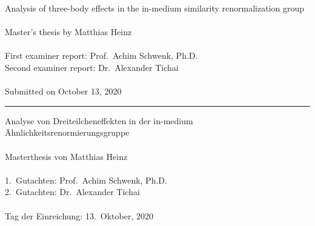 \noindent Analysis of three-body effects in the in-medium similarity renormalization group \\ \\
Master's thesis by Matthias Heinz \\ \\
First examiner report: Prof.~Achim Schwenk, Ph.D. \\
Second examiner report: Dr.~Alexander Tichai\\ \\
Submitted on October 13, 2020 \\
\hrule
\noindent Analyse von Dreiteilcheneffekten in der in-medium \"{A}hnlichkeitsrenormierungsgruppe \\ \\
Masterthesis von Matthias Heinz \\ \\
1.~Gutachten: Prof.~Achim Schwenk, Ph.D. \\
2.~Gutachten: Dr.~Alexander Tichai\\ \\
Tag der Einreichung: 13.~Oktober, 2020 \\

\vfill
\doclicenseThis
\clearpage